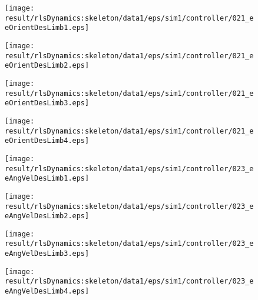\begin{figure}[h]
\centering
\begin{minipage}{0.24\linewidth}
\centering
\texttt{[image: \\result/rlsDynamics:skeleton/data1/eps/sim1/controller/021\_eeOrientDesLimb1.eps]}
\par\footnotesize{}
\end{minipage}
\begin{minipage}{0.24\linewidth}
\centering
\texttt{[image: \\result/rlsDynamics:skeleton/data1/eps/sim1/controller/021\_eeOrientDesLimb2.eps]}
\par\footnotesize{}
\end{minipage}
\begin{minipage}{0.24\linewidth}
\centering
\texttt{[image: \\result/rlsDynamics:skeleton/data1/eps/sim1/controller/021\_eeOrientDesLimb3.eps]}
\par\footnotesize{}
\end{minipage}
\begin{minipage}{0.24\linewidth}
\centering
\texttt{[image: \\result/rlsDynamics:skeleton/data1/eps/sim1/controller/021\_eeOrientDesLimb4.eps]}
\par\footnotesize{}
\end{minipage}
\begin{minipage}{0.24\linewidth}
\centering
\texttt{[image: \\result/rlsDynamics:skeleton/data1/eps/sim1/controller/023\_eeAngVelDesLimb1.eps]}
\par\footnotesize{}
\end{minipage}
\begin{minipage}{0.24\linewidth}
\centering
\texttt{[image: \\result/rlsDynamics:skeleton/data1/eps/sim1/controller/023\_eeAngVelDesLimb2.eps]}
\par\footnotesize{}
\end{minipage}
\begin{minipage}{0.24\linewidth}
\centering
\texttt{[image: \\result/rlsDynamics:skeleton/data1/eps/sim1/controller/023\_eeAngVelDesLimb3.eps]}
\par\footnotesize{}
\end{minipage}
\begin{minipage}{0.24\linewidth}
\centering
\texttt{[image: \\result/rlsDynamics:skeleton/data1/eps/sim1/controller/023\_eeAngVelDesLimb4.eps]}
\par\footnotesize{}
\end{minipage}
\begin{minipage}{0.24\linewidth}

\end{minipage}
\end{figure}
